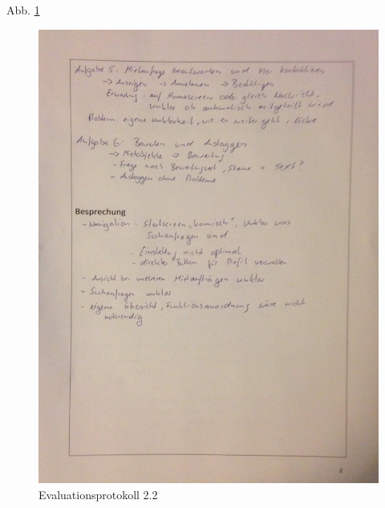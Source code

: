 Abb. \ref{fig:evaluation22}
\begin{figure}[H]
\includegraphics[width=1\textwidth]{./images/evaluation/eva22.JPG}
\caption{Evaluationsprotokoll 2.2}
\label{fig:evaluation22}
\end{figure}

